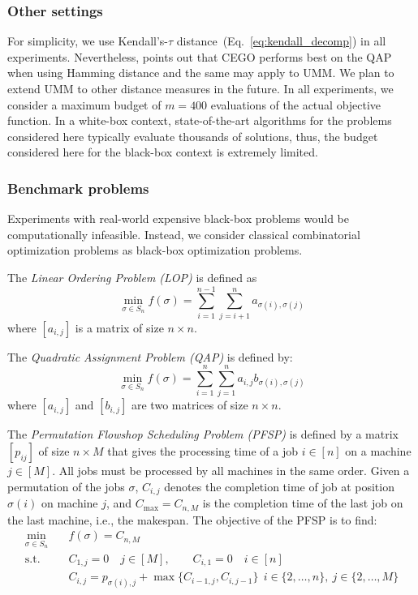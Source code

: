 \documentclass[runningheads]{llncs}
\newcommand{\FEmax}{\ensuremath{m}}
\begin{document}
\subsubsection{Other settings}
%
For simplicity, we use Kendall's-$\tau$
distance~(Eq.~\ref{eq:kendall_decomp}) in all experiments. Nevertheless,
\citet{ZaeStoFriFisNauBar2014} points out that CEGO performs best on the QAP
when using Hamming distance and the same may apply to UMM.
We plan to extend UMM to other distance measures in the future.  In all
experiments, we consider a maximum budget of $\FEmax=400$ evaluations of the
actual objective function. In a white-box context, state-of-the-art algorithms
for the problems considered here typically evaluate thousands of solutions,
thus, the budget considered here for the black-box context is extremely
limited.


\subsubsection{Benchmark problems}
%
Experiments with real-world expensive black-box problems would be computationally infeasible. Instead, we consider classical combinatorial optimization problems as black-box optimization problems.

The \emph{Linear Ordering Problem (LOP)} is defined as 
\begin{equation}\label{eq:lop}
  \min_{\sigma \in S_n} f(\sigma) = \sum_{i=1}^{n-1} \sum_{j=i+1}^n  a_{\sigma(i), \sigma(j)}
\end{equation}
where $[a_{i,j}]$ is a matrix of size $n \times n$.


The \emph{Quadratic Assignment Problem (QAP)} is defined by:
\begin{equation}\label{eq:qap}
  \min_{\sigma \in S_n} f(\sigma) = \sum_{i=1}^n \sum_{j=1}^n a_{i,j} b_{\sigma(i), \sigma(j)}
\end{equation}
%
where $[a_{i,j}]$ and $[b_{i,j}]$ are two matrices of size $n \times n$.

The \emph{Permutation Flowshop Scheduling Problem (PFSP)} is defined by a matrix $[p_{ij}]$ of size $n \times M$ that gives the processing time of a job $i \in [n]$ on a machine $j \in [M]$. All jobs must be processed by all machines in the same order. Given a permutation of the jobs $\sigma$, $C_{i,j}$ denotes the completion time of job at position $\sigma(i)$ on machine $j$, and $C_{\max} = C_{n,M}$  is the completion time of the last job on the last machine, i.e., the makespan. The objective of the PFSP is to find:
\begin{equation}\label{eq:pfsp}
  \begin{split}
    \min_{\sigma \in S_n}\quad& f(\sigma) = C_{n,M}\\
    \text{s.t.}\quad & C_{1,j} = 0 \quad j\in [M], \qquad C_{i,1} = 0\quad i \in [n]\\
    &C_{i,j} = p_{\sigma(i),j} + \max\{C_{i-1, j}, C_{i, j-1}\}  \ \  i \in \{2,\dotsc,n\},\ j \in\{2,\dotsc, M\}\\
\end{split}
\end{equation}
\end{document}
